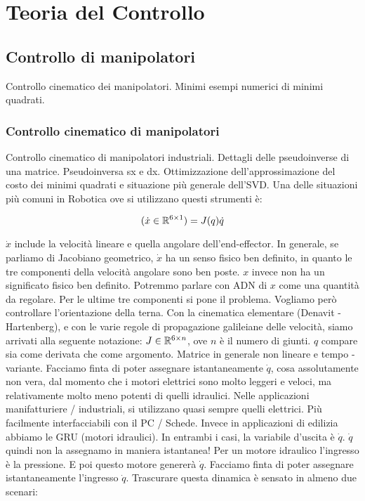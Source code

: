 
\chapter{Teoria del Controllo}
\label{cap:ctrl}

\section{Controllo di manipolatori}

Controllo cinematico dei manipolatori. Minimi esempi numerici di minimi quadrati.

\subsection{Controllo cinematico di manipolatori}

Controllo cinematico di manipolatori industriali. Dettagli delle pseudoinverse di una matrice. Pseudoinversa sx e dx. Ottimizzazione dell'approssimazione del costo dei minimi quadrati e situazione più generale dell'SVD. Una delle situazioni più comuni in Robotica ove si utilizzano questi strumenti è:

\[
	(\dot{x}\in\mathbb{R}^{6\times 1}) = J(q)\dot{q}
\]

$\dot{x}$ include la velocità lineare e quella angolare dell'end-effector. In generale, se parliamo di Jacobiano geometrico, $\dot{x}$ ha un senso fisico ben definito, in quanto le tre componenti della velocità angolare sono ben poste. $x$ invece non ha un significato fisico ben definito. Potremmo parlare con ADN di $x$ come una quantità da regolare. Per le ultime tre componenti si pone il problema. Vogliamo però controllare l'orientazione della terna. Con la cinematica elementare (Denavit - Hartenberg), e con le varie regole di propagazione galileiane delle velocità, siamo arrivati alla seguente notazione: $J\in\mathbb{R}^{6\times n}$, ove $n$ è il numero di giunti. $q$ compare sia come derivata che come argomento. Matrice in generale non lineare e tempo - variante. Facciamo finta di poter assegnare istantaneamente $\dot{q}$, cosa assolutamente non vera, dal momento che i motori elettrici sono molto leggeri e veloci, ma relativamente molto meno potenti di quelli idraulici. Nelle applicazioni manifatturiere / industriali, si utilizzano quasi sempre quelli elettrici. Più facilmente interfacciabili con il PC / Schede. Invece in applicazioni di edilizia abbiamo le GRU (motori idraulici). In entrambi i casi, la variabile d'uscita è $\dot{q}$. $\dot{q}$ quindi non la assegnamo in maniera istantanea! Per un motore idraulico l'ingresso è la pressione. E poi questo motore genererà $\dot{q}$. Facciamo finta di poter assegnare istantaneamente l'ingresso $\dot{q}$. Trascurare questa dinamica è sensato in almeno due scenari:

